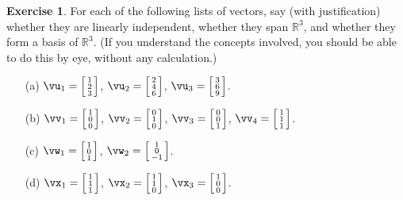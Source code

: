 \documentclass[a4paper]{amsart}
\newcommand{\R}         {{\mathbb{R}}}
\newcommand{\bsm}       {\left[\begin{smallmatrix}}
\newcommand{\esm}       {\end{smallmatrix}\right]}
\renewcommand{\:}{\colon}
\theoremstyle{definition}
\newtheorem{exercise}{Exercise}
\begin{document}
\begin{exercise}\label{ex-check-dependence}
 For each of the following lists of vectors, say (with justification) whether
 they are linearly independent, whether they span $\R^3$,
 and whether they form a basis of $\R^3$.  (If you
 understand the concepts involved, you should be able to do
 this by eye, without any calculation.)
 \begin{itemize}
  \item[(a)] $\vu_1=\bsm 1\\2\\3\esm$, 
             $\vu_2=\bsm 2\\4\\6\esm$,
             $\vu_3=\bsm 3\\6\\9\esm$.
  \item[(b)] $\vv_1=\bsm 1\\0\\0\esm$,
             $\vv_2=\bsm 0\\1\\0\esm$,
             $\vv_3=\bsm 0\\0\\1\esm$,
             $\vv_4=\bsm 1\\1\\1\esm$.
  \item[(c)] $\vw_1=\bsm 1\\0\\1\esm$,
             $\vw_2=\bsm 1\\0\\-1\esm$.
  \item[(d)] $\vx_1=\bsm 1\\1\\1\esm$,
             $\vx_2=\bsm 1\\1\\0\esm$,
             $\vx_3=\bsm 1\\0\\0\esm$.
 \end{itemize}
\end{exercise}
\end{document}
